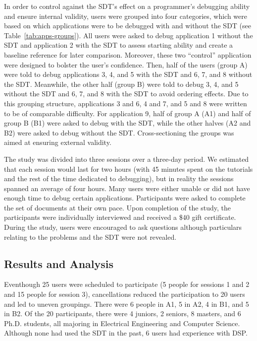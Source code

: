 \documentclass[11pt, letterpaper, onecolumn]{article}
\begin{document}
In  order  to control  against  the  SDT's  effect on  a  programmer's
debugging  ability and  ensure internal  validity, users  were grouped
into four categories,  which were based on which  applications were to
be     debugged     with      and     without     the     SDT     (see
Table~\ref{tab:apps-groups}).    All  users   were   asked  to   debug
application 1 without the SDT and application 2 with the SDT to assess
starting ability and create a baseline reference for later comparison.
Moreover, these  two ``control'' application were  designed to bolster
the user's confidence.  Then, half of the users (group A) were told to
debug applications 3,  4, and 5 with  the SDT and 6, 7,  and 8 without
the SDT. Meanwhile, the other half  (group B) were told to debug 3, 4,
and 5 without the  SDT and 6, 7, and 8 with  the SDT to avoid ordering
effects.  Due to this grouping  structure, applications 3 and 6, 4 and
7,  and 5  and 8  were written  to be  of comparable  difficulty.  For
application 9,  half of  group A (A1)  and half  of group B  (B1) were
asked to debug  with the SDT, while the other halves  (A2 and B2) were
asked to debug without the SDT.  Cross-sectioning the groups was aimed
at ensuring external validity.

The study was divided into three sessions over a three-day period.  We
estimated that each session would  last for two hours (with 45 minutes
spent  on  the  tutorials  and  the  rest of  the  time  dedicated  to
debugging), but  in reality  the sessions spanned  an average  of four
hours.  Many users  were either unable or did not  have enough time to
debug certain  applications.  Participants were asked  to complete the
set of documents at their own pace.  Upon completion of the study, the
participants were  individually interviewed  and received a  \$40 gift
certificate.  During the study, users were encouraged to ask questions
although particulars  relating to  the problems and  the SDT  were not
revealed.


\subsection{Results and Analysis}

Eventhough 25  users were  scheduled  to participate  (5 people  for
sessions 1 and  2 and 15 people for  session 3), cancellations reduced
the participation to 20 users  and led to uneven groupings. There were
6 people in A1, 5 in A2, 4 in B1, and 5 in B2. Of the 20 participants,
there were 4 juniors, 2 seniors,  8 masters, and 6 Ph.D. students, all
majoring in Electrical Engineering and Computer Science. Although none
had used the SDT in the past, 6 users had experience with DSP.
\end{document}
